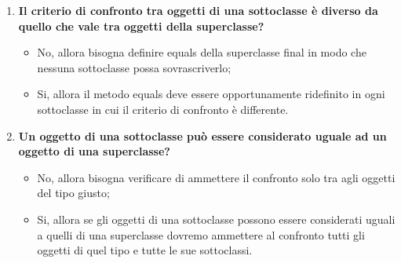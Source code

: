 \begin{enumerate}
\item \textbf{Il criterio di confronto tra oggetti di una sottoclasse è diverso da quello che vale tra oggetti della superclasse?}
\begin{itemize}
\item No, allora bisogna definire equals della superclasse final in modo che nessuna sottoclasse possa sovrascriverlo;
\item Si, allora il metodo equals deve essere opportunamente ridefinito in ogni sottoclasse in cui il criterio di confronto è differente.
\end{itemize}
\item \textbf{Un oggetto di una sottoclasse può essere considerato uguale ad un oggetto di una superclasse?}
\begin{itemize}
\item No, allora bisogna verificare di ammettere il confronto solo tra agli oggetti del tipo giusto;
\item Si, allora se gli oggetti di una sottoclasse possono essere considerati uguali a quelli di una superclasse dovremo ammettere al confronto tutti gli oggetti di quel tipo e tutte le sue sottoclassi.
\end{itemize}
\end{enumerate}

